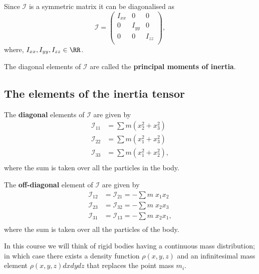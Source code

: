 \documentclass[12pt, a4paper]{article}
\begin{document}
\begin{corollary}
    Since \(\mathcal{I}\) is a symmetric matrix it can be diagonalised as
    \[\mathcal{I}=\begin{pmatrix}
        I_{xx} & 0 & 0 \\
        0 & I_{yy} & 0 \\
        0 & 0 & I_{zz} \\
    \end{pmatrix},\]
    where, \(I_{xx},I_{yy},I_{zz} \in \RR\).
\end{corollary}

\begin{definition}
    The diagonal elements of \(\mathcal{I}\) are called the \textbf{principal moments of inertia}.
\end{definition}

\subsection*{The elements of the inertia tensor}

\begin{proposition}
    The \textbf{diagonal} elements of \(\mathcal{I}\) are given by
    \[\begin{aligned}
        \mathcal{I}_{11} &= \sum m \left( x_2^2+x^2_3 \right) \\
        \mathcal{I}_{22} &= \sum m \left( x_1^2+x^2_3 \right) \\
        \mathcal{I}_{33} &= \sum m \left( x_1^2+x^2_2 \right), \\
    \end{aligned}\]
    where the sum is taken over all the particles in the body.
\end{proposition}

\begin{proposition}
    The \textbf{off-diagonal} element of \(\mathcal{I}\) are given by
    \[\begin{aligned}
        \mathcal{I}_{12} &= \mathcal{I}_{21} = - \sum m \; x_1 x_2 \\
        \mathcal{I}_{23} &= \mathcal{I}_{32} = - \sum m \; x_2 x_3 \\
        \mathcal{I}_{31} &= \mathcal{I}_{13} = - \sum m \; x_2 x_1, \\
    \end{aligned}\]
    where the sum is taken over all the particles of the body.
\end{proposition}

\noindent In this course we will think of rigid bodies having a continuous mass distribution; in which case there exists a density function \(\rho(x,y,z)\) and an infinitesimal mass element \(\rho(x,y,z)dxdydz\) that replaces the point mass \(m_i\).
\end{document}

